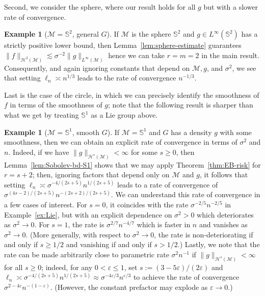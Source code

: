 \documentclass[preprint]{imsart}
\theoremstyle{plain}
\theoremstyle{definition}
\newtheorem{example}[theorem]{Example}
\newcommand{\Mcal}{\mathcal{M}}
\newcommand{\Hcal}{\mathcal{H}}
\begin{document}
Second, we consider the sphere, where our result holds for all $g$ but with a slower rate of convergence.

\begin{example}[$\Mcal=\mathbb{S}^2$, general $G$]\label{ex:EB-sphere-rate}
    If $\Mcal$ is the sphere $\mathbb{S}^2$ and $g\in L^{\infty}(\mathbb{S}^2)$ has a strictly positive lower bound, then Lemma~\ref{lem:sphere-estimate} guarantees $\|f\|_{\Hcal^2(\Mcal)}\lesssim \sigma^{-2}\|g\|_{L^{\infty}(\Mcal)}$ hence we can take $r=m=2$ in the main result.
    Consequently, and again ignoring constants that depend on $\Mcal,g$, and $\sigma^2$, we see that setting $\ell_n\asymp n^{1/3}$ leads to the rate of convergence $n^{-1/3}$.
\end{example}

Last is the case of the circle, in which we can precisely identify the smoothness of $f$ in terms of the smoothness of $g$; note that the following result is sharper than what we get by treating $\mathbb{S}^1$ as a Lie group above.

\begin{example}[$\Mcal=\mathbb{S}^1$, smooth $G$]\label{ex:empirical-S1-smooth}
    If $\Mcal = \mathbb{S}^1$ and $G$ has a density $g$ with some smoothness, then we can obtain an explicit rate of convergence in terms of $\sigma^2$ and $n$.
    Indeed, if we have $\|g\|_{\Hcal^s(\Mcal)}<\infty$ for some $s\ge 0$, then Lemma~\ref{lem:Sobolev-bd-S1} shows that we may apply Theorem~\ref{thm:EB-risk} for $r=s+2$; then, ignoring factors that depend only on $\Mcal$ and $g$, it follows that setting $\ell_n\asymp \sigma^{-4/(2s+5)}n^{1/(2s+5)}$ leads to a rate of convergence of $\sigma^{(4s-2)/(2s+5)}n^{-(2s+2)/(2s+5)}$.
    We can understand this rate of convergence in a few cases of interest.
    For $s=0$, it coincides with the rate $\sigma^{-2/5}n^{-2/5}$ in Example~\ref{ex:Lie}, but with an explicit dependence on $\sigma^2>0$ which deteriorates as $\sigma^2\to 0$.
    For $s=1$, the rate is $\sigma^{2/7}n^{-4/7}$ which is faster in $n$ and vanishes as $\sigma^2\to 0$.
    (More generally, with respect to $\sigma^2\to 0$, the rate is non-deteriorating if and only if $s\ge 1/2$ and vanishing if and only if $s> 1/2$.)
    Lastly, we note that the rate can be made arbitrarily close to parametric rate $\sigma^2n^{-1}$ if $\|g\|_{\Hcal^s(\Mcal)}<\infty$ for all $s\ge 0$; indeed, for any $0<\varepsilon\le 1$, set $s:=(3-5\varepsilon)/(2\varepsilon)$ and $\ell_n\asymp \sigma^{-4/(2s+5)}n^{1/(2s+5)}\approx \sigma^{-4\varepsilon/3}n^{\varepsilon/3}$ to achieve the rate of convergence $\sigma^{2-4\varepsilon}n^{-(1-\varepsilon)}$.
    (However, the constant prefactor may explode as $\varepsilon\to 0$.) 
\end{example}
\end{document}
